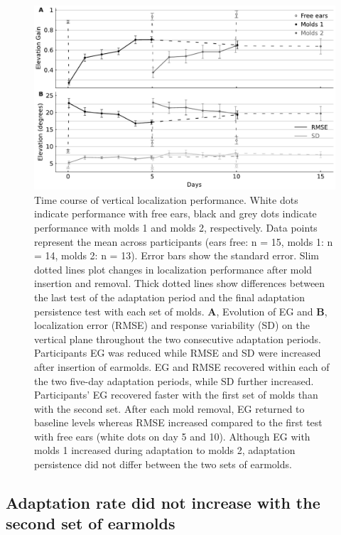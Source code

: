  \begin{figure}[h]
	\includegraphics[width=18cm, center]{../Results/figures/fig5/fig5}
	\caption{Time course of vertical localization performance. White dots indicate performance with free ears, black and grey dots indicate performance with molds 1 and molds 2, respectively. Data points represent the mean across participants (ears free: n = 15, molds 1: n = 14, molds 2: n = 13). Error bars show the standard error. Slim dotted lines plot changes in localization performance after mold insertion and removal. Thick dotted lines show differences between the last test of the adaptation period and the final adaptation persistence test with each set of molds. \textbf{A}, Evolution of EG and \textbf{B}, localization error (RMSE) and response variability (SD) on the vertical plane throughout the two consecutive adaptation periods. Participants EG was reduced while RMSE and SD were increased after insertion of earmolds. EG and RMSE recovered within each of the two five-day adaptation periods, while SD further increased. Participants' EG recovered faster with the first set of molds than with the second set. After each mold removal, EG returned to baseline levels whereas RMSE increased compared to the first test with free ears (white dots on day 5 and 10). Although EG with molds 1 increased during adaptation to molds 2, adaptation persistence did not differ between the two sets of earmolds.}
        \label{fig:adaptation}
\end{figure}

\subsection{Adaptation rate did not increase with the second set of earmolds}


